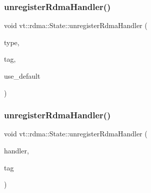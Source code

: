 \mbox{\label{structvt_1_1rdma_1_1_state_a3c506325f5d0ce4bb46f93f046dd5e3a}} 
\subsubsection{\texorpdfstring{unregister\+Rdma\+Handler()}{unregisterRdmaHandler()}\hspace{0.1cm}{\footnotesize\ttfamily [1/2]}}
{\footnotesize\ttfamily void vt\+::rdma\+::\+State\+::unregister\+Rdma\+Handler (\begin{DoxyParamCaption}\item[{\hyperlink{namespacevt_1_1rdma_ac848e1d9da43db6294bd06f83e5d3946}{R\+D\+M\+A\+\_\+\+Type\+Type} const \&}]{type,  }\item[{\hyperlink{namespacevt_a84ab281dae04a52a4b243d6bf62d0e52}{Tag\+Type} const \&}]{tag,  }\item[{bool const \&}]{use\+\_\+default }\end{DoxyParamCaption})}

\mbox{\label{structvt_1_1rdma_1_1_state_a03702b768cf198e89b9f0323c12d916c}} 
\subsubsection{\texorpdfstring{unregister\+Rdma\+Handler()}{unregisterRdmaHandler()}\hspace{0.1cm}{\footnotesize\ttfamily [2/2]}}
{\footnotesize\ttfamily void vt\+::rdma\+::\+State\+::unregister\+Rdma\+Handler (\begin{DoxyParamCaption}\item[{\hyperlink{namespacevt_a9530efb893c0f3846e8ac5f0507e0f49}{R\+D\+M\+A\+\_\+\+Handler\+Type} const \&}]{handler,  }\item[{\hyperlink{namespacevt_a84ab281dae04a52a4b243d6bf62d0e52}{Tag\+Type} const \&}]{tag }\end{DoxyParamCaption})}



